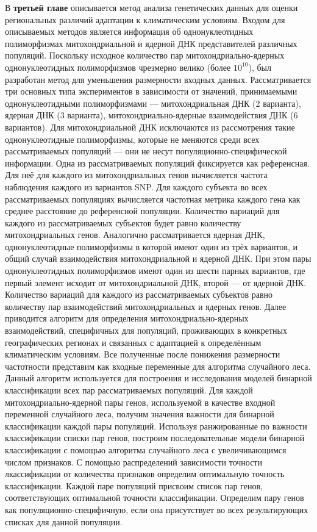 В \textbf{третьей главе} описывается метод анализа генетических данных для оценки региональных различий адаптации к климатическим условиям. Входом для описываемых методов является информация об однонуклеотидных полиморфизмах митохондриальной и ядерной ДНК представителей различных популяций. Поскольку исходное количество пар митохондриально-ядерных однонуклеотидных полиморфизмов чрезмерно велико (более $10^{10}$), был разработан метод для уменьшения размерности входных данных. Рассматривается три основных типа экспериментов в зависимости от значений, принимаемыми однонуклеотидными полиморфизмами --- митохондриальная ДНК (2 варианта), ядерная ДНК (3 варианта), митохондриально-ядерные взаимодействия ДНК (6 вариантов). Для митохондриальной ДНК исключаются из рассмотрения такие однонуклеотидные полиморфизмы, которые не меняются среди всех рассматриваемых популяций --- они не несут популяционно-специфической информации. Одна из рассматриваемых популяций фиксируется как референсная. Для неё для каждого из митохондриальных генов вычисляется частота наблюдения каждого из вариантов SNP. Для каждого субъекта во всех рассматриваемых популяциях вычисляется частотная метрика каждого гена как среднее расстояние до референсной популяции. Количество вариаций для каждого из рассматриваемых субъектов будет равно количеству митохондриальных генов. Аналогично рассматривается ядерная ДНК, однонуклеотидные полиморфизмы в которой имеют один из трёх вариантов, и общий случай взаимодействия митохондриальной и ядерной ДНК. При этом пары однонуклеотидных полиморфизмов имеют один из шести парных вариантов, где первый элемент исходит от митохондриальной ДНК, второй --- от ядерной ДНК. Количество вариаций для каждого из рассматриваемых субъектов равно количеству пар взаимодействий митохондриальных и ядерных генов. Далее приводится алгоритм для определения митохондриально-ядерных взаимодействий, специфичных для популяций, проживающих в конкретных географических регионах и связанных с адаптацией к определённым климатическим условиям. Все полученные после понижения размерности частотности представим как входные переменные для алгоритма случайного леса. Данный алгоритм используется для построения и исследования моделей бинарной классификации всех пар рассматриваемых популяций. Для каждой митохондриально-ядерной пары генов, используемой в качестве входной переменной случайного леса, получим значения важности для бинарной классификации каждой пары популяций. Используя ранжированные по важности классификации списки пар генов, построим последовательные модели бинарной классификации с помощью алгоритма случайного леса с увеличивающимся числом признаков. С помощью распределений зависимости точности лкассификации от количества признаков определим оптимальную точность классификации. Каждой паре популяций присвоим список пар генов, соответствующих оптимальной точности классификации. Определим пару генов как популяционно-специфичную, если она присутствует во всех результирующих списках для данной популяции.

